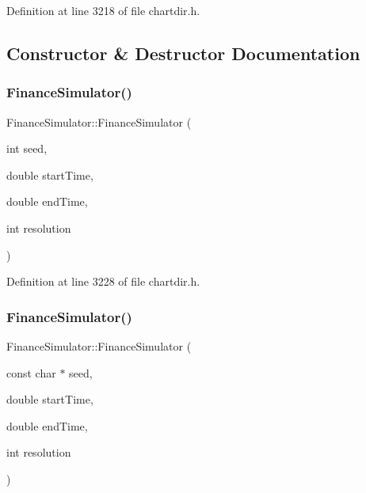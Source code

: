 Definition at line 3218 of file chartdir.\+h.



\subsection{Constructor \& Destructor Documentation}
\mbox{\label{class_finance_simulator_a5bb9533a4116a6cdce8004448c8a1a6d}} 
\subsubsection{\texorpdfstring{Finance\+Simulator()}{FinanceSimulator()}\hspace{0.1cm}{\footnotesize\ttfamily [1/2]}}
{\footnotesize\ttfamily Finance\+Simulator\+::\+Finance\+Simulator (\begin{DoxyParamCaption}\item[{int}]{seed,  }\item[{double}]{start\+Time,  }\item[{double}]{end\+Time,  }\item[{int}]{resolution }\end{DoxyParamCaption})\hspace{0.3cm}{\ttfamily [inline]}}



Definition at line 3228 of file chartdir.\+h.

\mbox{\label{class_finance_simulator_a8ef2341c687fba400c23a498172bdcca}} 
\subsubsection{\texorpdfstring{Finance\+Simulator()}{FinanceSimulator()}\hspace{0.1cm}{\footnotesize\ttfamily [2/2]}}
{\footnotesize\ttfamily Finance\+Simulator\+::\+Finance\+Simulator (\begin{DoxyParamCaption}\item[{const char $\ast$}]{seed,  }\item[{double}]{start\+Time,  }\item[{double}]{end\+Time,  }\item[{int}]{resolution }\end{DoxyParamCaption})\hspace{0.3cm}{\ttfamily [inline]}}




